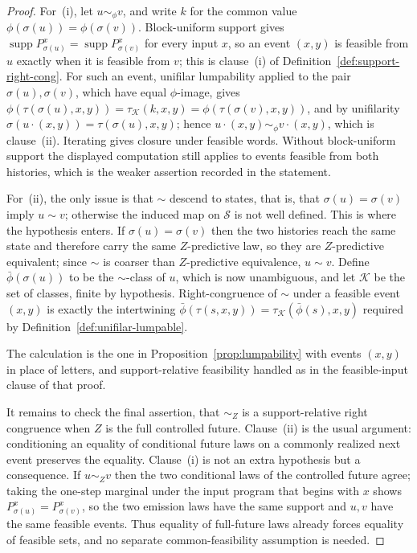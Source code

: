 \documentclass[12pt]{article}
\theoremstyle{definition}
\DeclareMathOperator{\supp}{supp}
\begin{document}
\begin{proof}
For~(i), let $u\sim_\phi v$, and write $k$ for the common value
$\phi(\sigma(u))=\phi(\sigma(v))$.  Block-uniform support gives
$\supp P_{\sigma(u)}^x=\supp P_{\sigma(v)}^x$ for every input $x$, so an event
$(x,y)$ is feasible from $u$ exactly when it is feasible from $v$; this is
clause~(i) of Definition~\ref{def:support-right-cong}.  For such an event,
unifilar lumpability applied to the pair $\sigma(u),\sigma(v)$, which have
equal $\phi$-image, gives
$\phi(\tau(\sigma(u),x,y))=\tau_{\mathcal K}(k,x,y)=\phi(\tau(\sigma(v),x,y))$,
and by unifilarity $\sigma(u\cdot(x,y))=\tau(\sigma(u),x,y)$; hence
$u\cdot(x,y)\sim_\phi v\cdot(x,y)$, which is clause~(ii).  Iterating gives
closure under feasible words.  Without block-uniform support the displayed
computation still applies to events feasible from both histories, which is the
weaker assertion recorded in the statement.

For~(ii), the only issue is that $\sim$ descend to states, that is, that
$\sigma(u)=\sigma(v)$ imply $u\sim v$; otherwise the induced map on
$\mathcal S$ is not well defined.  This is where the hypothesis enters.  If
$\sigma(u)=\sigma(v)$ then the two histories reach the same state and
therefore carry the same $Z$-predictive law, so they are $Z$-predictive
equivalent; since $\sim$ is coarser than $Z$-predictive equivalence,
$u\sim v$.  Define $\bar\phi(\sigma(u))$ to be the $\sim$-class of $u$, which
is now unambiguous, and let $\mathcal K$ be the set of classes, finite by
hypothesis.  Right-congruence of $\sim$ under a feasible event $(x,y)$ is
exactly the intertwining
$\bar\phi(\tau(s,x,y))=\tau_{\mathcal K}(\bar\phi(s),x,y)$ required by
Definition~\ref{def:unifilar-lumpable}.

The calculation is the one in Proposition~\ref{prop:lumpability} with events
$(x,y)$ in place of letters, and support-relative feasibility handled as in
the feasible-input clause of that proof.

It remains to check the final assertion, that $\sim_Z$ is a support-relative
right congruence when $Z$ is the full controlled future.  Clause~(ii) is the
usual argument: conditioning an equality of conditional future laws on a
commonly realized next event preserves the equality.  Clause~(i) is not an
extra hypothesis but a consequence.  If $u\sim_Zv$ then the two conditional
laws of the controlled future agree; taking the one-step marginal under the
input program that begins with $x$ shows $P_{\sigma(u)}^x=P_{\sigma(v)}^x$, so
the two emission laws have the same support and $u,v$ have the same feasible
events.  Thus equality of full-future laws already forces equality of feasible
sets, and no separate common-feasibility assumption is needed.
\end{proof}
\end{document}
